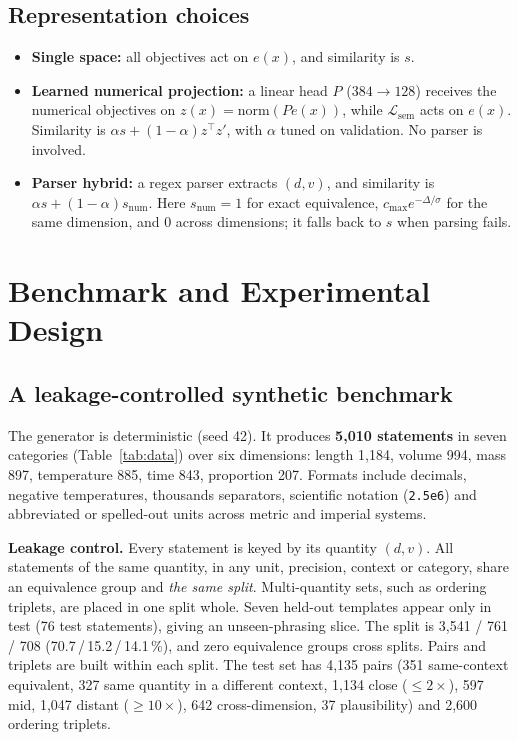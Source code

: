 \documentclass[11pt]{article}
\newcommand{\Lq}{\mathcal{L}}
\newcommand{\sem}{\mathrm{sem}}
\begin{document}
\subsection{Representation choices}
\begin{itemize}[leftmargin=*,itemsep=2pt]
\item \textbf{Single space:} all objectives act on $e(x)$, and similarity is $s$.
\item \textbf{Learned numerical projection:} a linear head $P$ ($384\to128$) receives the numerical objectives on
$z(x)=\mathrm{norm}(Pe(x))$, while $\Lq_\sem$ acts on $e(x)$. Similarity is $\alpha s + (1-\alpha) z^\top z'$, with
$\alpha$ tuned on validation. No parser is involved.
\item \textbf{Parser hybrid:} a regex parser extracts $(d,v)$, and similarity is
$\alpha s + (1-\alpha)s_{\mathrm{num}}$. Here $s_{\mathrm{num}}=1$ for exact equivalence,
$c_{\max}e^{-\Delta/\sigma}$ for the same dimension, and $0$ across dimensions; it falls back to $s$ when parsing fails.
\end{itemize}

\section{Benchmark and Experimental Design}
\label{sec:design}
\subsection{A leakage-controlled synthetic benchmark}
The generator is deterministic (seed 42). It produces \textbf{5{,}010 statements} in seven categories
(Table~\ref{tab:data}) over six dimensions: length 1{,}184, volume 994, mass 897, temperature 885, time 843,
proportion 207. Formats include decimals, negative temperatures, thousands separators, scientific notation
(\texttt{2.5e6}) and abbreviated or spelled-out units across metric and imperial systems.

\textbf{Leakage control.} Every statement is keyed by its quantity $(d, v)$. All statements of the same quantity, in
any unit, precision, context or category, share an equivalence group and \emph{the same split}. Multi-quantity sets,
such as ordering triplets, are placed in one split whole. Seven held-out templates appear only in test (76 test
statements), giving an unseen-phrasing slice. The split is 3{,}541 / 761 / 708 (70.7\,/\,15.2\,/\,14.1\,\%), and zero
equivalence groups cross splits. Pairs and triplets are built within each split. The test set has 4{,}135 pairs
(351 same-context equivalent, 327 same quantity in a different context, 1{,}134 close ($\le2\times$), 597 mid, 1{,}047
distant ($\ge10\times$), 642 cross-dimension, 37 plausibility) and 2{,}600 ordering triplets.
\end{document}

